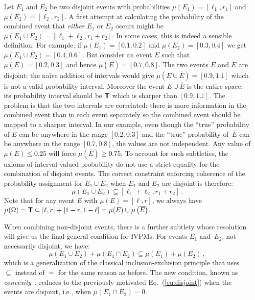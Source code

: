 \documentclass[english,reprint, aps, prl,superscriptaddress, showpacs,
showkeys, longbibliography, amsmath, amssymb, floatfix]{revtex4-1}
\theoremstyle{plain}
\theoremstyle{definition}
\newcommand{\necess}{\textbf{\textsf{T}}}
\begin{document}
Let $E_1$ and $E_2$ be two disjoint events with probabilities
$\mu(E_1)=[\ell_1,r_1]$ and $\mu(E_2)=[\ell_2,r_2]$. A first attempt
at calculating the probability of the combined event that
\emph{either} $E_1$ or $E_2$ occurs might be
$\mu(E_1\cup E_2) = [\ell_1+\ell_2,r_1+r_2]$. In some cases, this is
indeed a sensible definition. For example, if $\mu(E_1)=[0.1,0.2]$ and
$\mu(E_2)=[0.3,0.4]$ we get $\mu(E_1\cup E_2) = [0.4,0.6]$. But
consider an event $E$ such that $\mu(E)=[0.2,0.3]$ and hence
$\mu\left(\overline{E}\right)=[0.7,0.8]$. The two events $E$ and $\overline{E}$
are disjoint; the naïve addition of intervals would give
$\mu\left(E\cup\overline{E}\right)=[0.9,1.1]$ which is not a valid probability
interval. Moreover the event $E\cup\overline{E}$ is the
entire space; its probability interval should be
$\necess$ which is sharper than $[0.9,1.1]$. The problem is that the
two intervals are correlated: there is more information in the
combined event than in each event separately so the combined event should be mapped to
a sharper interval. In our example, even
though the ``true'' probability of $E$ can be anywhere in the range
$[0.2,0.3]$ and the ``true'' probability of~$\overline{E}$ can be
anywhere in the range $[0.7,0.8]$, the values are not independent. Any
value of $\mu(E) \leq 0.25$ will force $\mu\left(\overline{E}\right)\geq
0.75$. To account for such subtleties, the axioms of interval-valued
probability do not use a strict equality for the combination of
disjoint events. The correct constraint enforcing coherence of
the probability assignment for
$E_1\cup E_2$ when $E_1$ and $E_2$ are disjoint is therefore:
\begin{equation}
\label{eq:disjoint}
\mu(E_1\cup E_2) \subseteq [\ell_1+\ell_2,r_1+r_2]\,.
\end{equation}
Note that for any event $E$ with $\mu(E)=[\ell,r]$, we always have
$\mu(\Omega)=\necess\subseteq[\ell,r]+[1-r,1-\ell]=\mu(E)\cup\mu\left(\overline{E}\right)$.

When combining non-disjoint events, there is a further subtlety whose
resolution will give us the final general condition for IVPMs. For
events $E_1$ and~$E_2$, not necessarily disjoint, we have:
\begin{equation}
\mu(E_1\cup E_2) + \mu(E_1\cap E_2) \subseteq \mu(E_1) + \mu(E_2)\,,
\label{eq:classicalconvex}
\end{equation}
which is a generalization of the classical inclusion-exclusion
principle that uses $\subseteq$ instead of $=$ for the same reason as
before. The new condition, known as
\emph{convexity}~\cite{Shapley1971,GilboaSchmeidler1994,NgMoYeh1997,Marinacci1999,MarinacciMontrucchio2005,Grabisch2016},
reduces to the previously motivated Eq.~(\ref{eq:disjoint}) when the
events are disjoint, i.e., when $\mu(E_1\cap E_2) = 0$.
\end{document}
